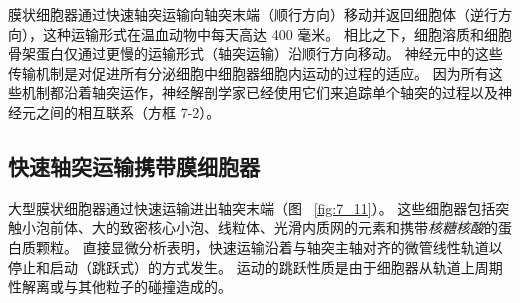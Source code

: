 膜状细胞器通过快速轴突运输向轴突末端（顺行方向）移动并返回细胞体（逆行方向），这种运输形式在温血动物中每天高达 400 毫米。
相比之下，细胞溶质和细胞骨架蛋白仅通过更慢的运输形式（轴突运输）沿顺行方向移动。
神经元中的这些传输机制是对促进所有分泌细胞中细胞器细胞内运动的过程的适应。
因为所有这些机制都沿着轴突运作，神经解剖学家已经使用它们来追踪单个轴突的过程以及神经元之间的相互联系（方框 7-2）。



\subsection{快速轴突运输携带膜细胞器}

大型膜状细胞器通过快速运输进出轴突末端（图 ~\ref{fig:7_11}）。
这些细胞器包括突触小泡前体、大的致密核心小泡、线粒体、光滑内质网的元素和携带\textit{核糖核酸}的蛋白质颗粒。
直接显微分析表明，快速运输沿着与轴突主轴对齐的微管线性轨道以停止和启动（跳跃式）的方式发生。
运动的跳跃性质是由于细胞器从轨道上周期性解离或与其他粒子的碰撞造成的。


